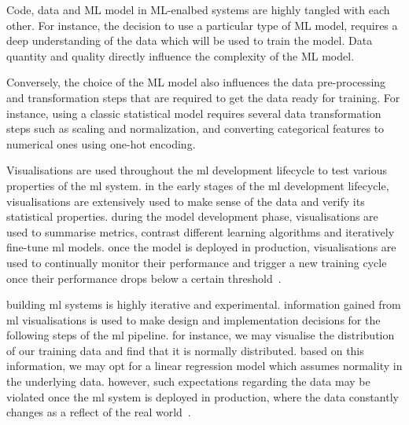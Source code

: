 


Code, data and ML model in ML-enalbed systems are highly tangled with each other. For instance, the decision to use a particular type of ML model, requires a deep understanding of the data which will be used to train the model. Data quantity and quality directly influence the complexity of the ML model. 

Conversely, the choice of the ML model also influences the data pre-processing and transformation steps that are required to get the data ready for training. For instance, using a classic statistical model requires several data transformation steps such as scaling and normalization, and converting categorical features to numerical ones using one-hot encoding.

Visualisations are used throughout the ml development lifecycle to test various properties of the ml system. in the early stages of the ml development lifecycle, visualisations are extensively used to make sense of the data and verify its statistical properties. during the model development phase, visualisations are used to summarise metrics, contrast different learning algorithms and iteratively fine-tune ml models. once the model is deployed in production, visualisations are used to continually monitor their performance and trigger a new training cycle once their performance drops below a certain threshold~\cite{yuan2021survey,hohman2019visual,amershi2015modeltracker,wexler2020if}.

building ml systems is highly iterative and experimental. information gained from ml visualisations is used to make design and implementation decisions for the following steps of the ml pipeline. for instance, we may visualise the distribution of our training data and find that it is normally distributed. based on this information, we may opt for a linear regression model which assumes normality in the underlying data. however, such expectations regarding the data may be violated once the ml system is deployed in production, where the data constantly changes as a reflect of the real world~\cite{amershi2019software,sambasivan2021everyone,breck2019data,baylor2017tfx}.

